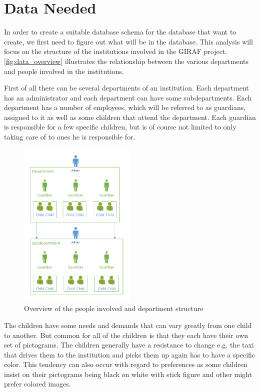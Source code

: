 \section{Data Needed}
In order to create a suitable database schema for the database that want to create, we first need to figure out what will be in the database. This analysis will focus on the structure of the institutions involved in the GIRAF project. \autoref{fig:data_overview} illustrates the relationship between the various departments and people involved in the institutions.

First of all there can be several departments of an institution. Each department has an administrator and each department can have some subdepartments. Each department has a number of employees, which will be referred to as guardians, assigned to it as well as some children that attend the department. Each guardian is responsible for a few specific children, but is of course not limited to only taking care of to ones he is responsible for. 

\begin{figure}
	\begin{center}
	\includegraphics[width=0.5\textwidth]{img/data_overview.pdf}
	\end{center}
	\label{fig:data_overview}
	\caption{Overview of the people involved and department structure}
\end{figure} 

The children have some needs and demands that can vary greatly from one child to another. But common for all of the children is that they each have their own set of pictograms. The children generally have a resistance to change e.g. the taxi that drives them to the institution and picks them up again has to have a specific color. This tendency can also occur with regard to preferences as some children insist on their pictograms being black on white with stick figure and other might prefer colored images. 

